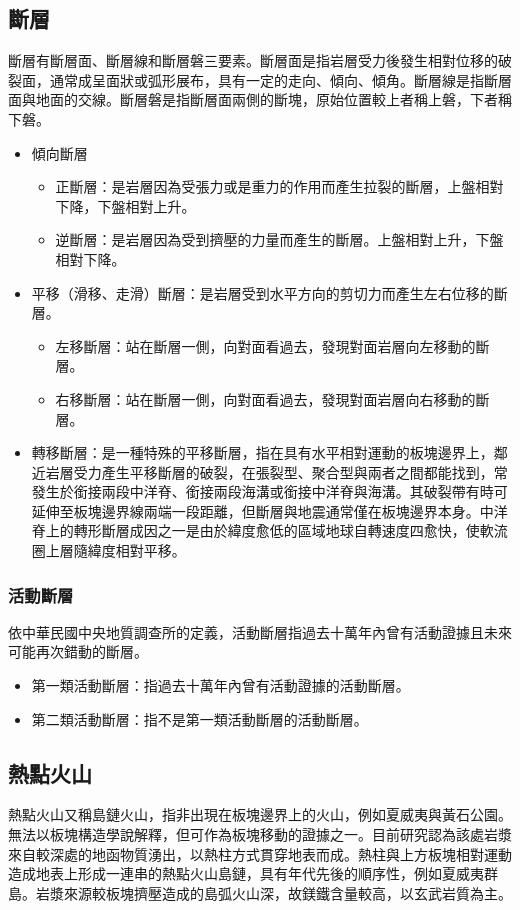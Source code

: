 \documentclass[a4paper,12pt]{report}
\begin{document}
\subsection{斷層}
斷層有斷層面、斷層線和斷層磐三要素。斷層面是指岩層受力後發生相對位移的破裂面，通常成呈面狀或弧形展布，具有一定的走向、傾向、傾角。斷層線是指斷層面與地面的交線。斷層磐是指斷層面兩側的斷塊，原始位置較上者稱上磐，下者稱下磐。
\begin{itemize}
\item 傾向斷層
\begin{itemize}
\item 正斷層：是岩層因為受張力或是重力的作用而產生拉裂的斷層，上盤相對下降，下盤相對上升。
\item 逆斷層：是岩層因為受到擠壓的力量而產生的斷層。上盤相對上升，下盤相對下降。
\end{itemize}
\item 平移（滑移、走滑）斷層：是岩層受到水平方向的剪切力而產生左右位移的斷層。
\begin{itemize}
\item 左移斷層：站在斷層一側，向對面看過去，發現對面岩層向左移動的斷層。
\item 右移斷層：站在斷層一側，向對面看過去，發現對面岩層向右移動的斷層。
\end{itemize}
\item 轉移斷層：是一種特殊的平移斷層，指在具有水平相對運動的板塊邊界上，鄰近岩層受力產生平移斷層的破裂，在張裂型、聚合型與兩者之間都能找到，常發生於銜接兩段中洋脊、銜接兩段海溝或銜接中洋脊與海溝。其破裂帶有時可延伸至板塊邊界線兩端一段距離，但斷層與地震通常僅在板塊邊界本身。中洋脊上的轉形斷層成因之一是由於緯度愈低的區域地球自轉速度四愈快，使軟流圈上層隨緯度相對平移。
\end{itemize}
\subsubsection{活動斷層}
依中華民國中央地質調查所的定義，活動斷層指過去十萬年內曾有活動證據且未來可能再次錯動的斷層。
\begin{itemize}
\item 第一類活動斷層：指過去十萬年內曾有活動證據的活動斷層。
\item 第二類活動斷層：指不是第一類活動斷層的活動斷層。
\end{itemize}
\subsection{熱點火山}
熱點火山又稱島鏈火山，指非出現在板塊邊界上的火山，例如夏威夷與黃石公園。無法以板塊構造學說解釋，但可作為板塊移動的證據之一。目前研究認為該處岩漿來自較深處的地函物質湧出，以熱柱方式貫穿地表而成。熱柱與上方板塊相對運動造成地表上形成一連串的熱點火山島鏈，具有年代先後的順序性，例如夏威夷群島。岩漿來源較板塊擠壓造成的島弧火山深，故鎂鐵含量較高，以玄武岩質為主。
\end{document}
